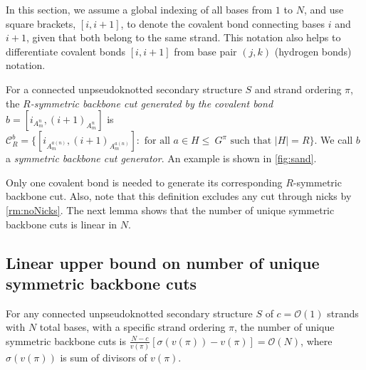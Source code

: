 \begin{remark}\label{rm:noNicks}
	In this section, we assume a global indexing of all bases from $1$ to $N$, and use square brackets, $[i, i+1]$, to  denote the covalent bond connecting bases $i$ and $i +1$, given that both belong to the same strand. This notation also helps to differentiate covalent bonds $[i, i+1]$ from base pair $(j,k)$ (hydrogen bonds)  notation. 
\end{remark}

\begin{Definition}\label{def:cut}
	For  a connected unpseudoknotted secondary structure $S$ and strand ordering $\pi$, the {\em $R$-symmetric backbone cut generated by the covalent bond} $b=[i_{A_m^n}, (i+1)_{A_m^n}]$ is $\mathcal{C}_R^b = \{ [i_{A_m^{a(n)}}, ({i+1})_{A_{m}^{a(n)}}]: \textrm{ for all } a \in H \!\!\leq \!\! \!\ G^\pi \textrm{ such that } |H| = R \}$. We call $b$ a {\em symmetric backbone cut generator}. An example is shown in \cref{fig:sand}.
\end{Definition}


Only one covalent bond is needed to generate its corresponding $R$-symmetric backbone cut. Also, note that this definition excludes any cut through nicks by \cref{rm:noNicks}. The next lemma shows that the number of unique symmetric backbone cuts is linear in $N$.

\subsection{Linear upper bound on number of unique symmetric backbone cuts}

\begin{lemma}\label{lem:ub}
	For any connected unpseudoknotted secondary structure $S$ of $c=\mathcal{O}(1)$ strands with $N$ total bases, with a specific strand ordering $\pi$, the number of  unique symmetric backbone cuts is $\frac{N-c}{v(\pi)} \left[ \sigma(v(\pi))-v(\pi) \right] = \mathcal{O}(N)$, where $\sigma(v(\pi))$ is sum of divisors of $v(\pi)$. 
\end{lemma}

